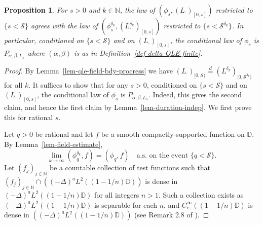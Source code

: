 \documentclass[a4paper]{article}
\numberwithin{equation}{section}
\newcommand{\eqb}{\begin{equation}}
\newcommand{\eqe}{\end{equation}}
\newcommand{\D}{\mathbb{D}}
\newcommand{\N}{\mathbb{N}}
\newcommand{\qduration}{\mathcal{S}}
\newtheorem{proposition}[theorem]{Proposition}
\theoremstyle{remark}
\numberwithin{equation}{section}
\begin{document}
\begin{proposition}\label{prop-bd-length-consistent-reals}
For $s>0$ and $k \in \mathbb N$, the law of $(\phi_s, (L_\cdot)_{[0,s]})$ restricted to $\{ s < \qduration\}$ agrees with the law of $(\phi_s^{\delta_k}, (L_\cdot^{\delta_k})_{[0,s]})$ restricted to $\{ s < \qduration^{\delta_k}\}$. In particular, conditioned on $\{ s < \qduration\}$ and on $(L_\cdot)_{[0,s]}$, the conditional law of $\phi_s$ is $P_{\alpha, \beta, L_s}$ where $(\alpha, \beta)$ is as in Definition~\ref{def-delta-QLE-finite}.
\end{proposition}
\begin{proof}
By Lemma~\ref{lem-qle-field-bdy-procress} we have $(L_\cdot)_{[0,\qduration)} \stackrel d= (L^{\delta_k})_{[0,\qduration^{\delta_k})}$ for all $k$. It suffices to show that for any $s>0$, conditioned on $\{s < \qduration\}$ and on $(L_\cdot)_{[0,s]}$, the conditional law of $\phi_s$ is $P_{\alpha, \beta, L_s}$. Indeed, this gives the second claim, and hence the first claim by Lemma~\ref{lem-duration-indep}. We first prove this for rational $s$. 

Let $q > 0$ be rational and let $f$ be a smooth compactly-supported function on $\D$. By Lemma~\ref{lem-field-estimate}, 
\eqb\label{eq-phi-limit}
\lim_{k \to \infty}  (\phi_{q}^{\delta_k}, f) = (\phi_q, f)\quad \text{a.s.\ on the event }\{q < \qduration\}.
\eqe
Let $(f_{j})_{j\in \N}$ be a countable collection of test functions such that $(f_{j})_{j \in \N} \cap ((-\Delta)^a L^2((1 - 1/n)\D))$ is dense in $(-\Delta)^a L^2((1 - 1/n)\D)$ for all integers $n > 1$. Such a collection exists as $(-\Delta)^a L^2((1 - 1/n)\D)$ is separable for each $n$, and %
$C_c^\infty((1-1/n)\D)$
is dense in $((-\Delta)^a L^2((1 - 1/n)\D))$ (see Remark 2.8 of \cite{shef-gff}). %


\end{proof}
\end{document}
